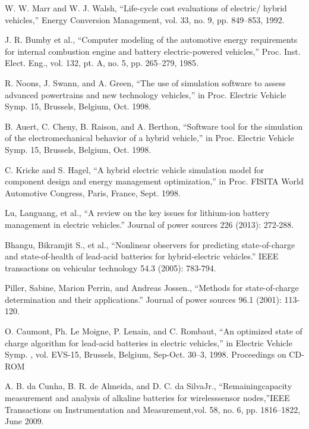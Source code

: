 
W. W. Marr and W. J. Walsh, ``Life-cycle cost evaluations of electric/
hybrid vehicles,” Energy Conversion Management, vol. 33, no. 9,
pp. 849–853, 1992.

J. R. Bumby et al., ``Computer modeling of the automotive energy requirements
for internal combustion engine and battery electric-powered
vehicles,” Proc. Inst. Elect. Eng., vol. 132, pt. A, no. 5, pp. 265–279,
1985.

R. Noons, J. Swann, and A. Green, ``The use of simulation software
to assess advanced powertrains and new technology vehicles,” in Proc.
Electric Vehicle Symp. 15, Brussels, Belgium, Oct. 1998.

B. Auert, C. Cheny, B. Raison, and A. Berthon, ``Software tool for the
simulation of the electromechanical behavior of a hybrid vehicle,” in
Proc. Electric Vehicle Symp. 15, Brussels, Belgium, Oct. 1998.

C. Kricke and S. Hagel, ``A hybrid electric vehicle simulation model
for component design and energy management optimization,” in Proc.
FISITA World Automotive Congress, Paris, France, Sept. 1998.

Lu, Languang, et al., ``A review on the key issues for lithium-ion battery management in electric vehicles.'' Journal of power sources 226 (2013): 272-288.

Bhangu, Bikramjit S., et al., ``Nonlinear observers for predicting state-of-charge and state-of-health of lead-acid batteries for hybrid-electric vehicles.'' IEEE transactions on vehicular technology 54.3 (2005): 783-794.

Piller, Sabine, Marion Perrin, and Andreas Jossen., ``Methods for state-of-charge determination and their applications.'' Journal of power sources 96.1 (2001): 113-120.

O. Caumont, Ph. Le Moigne, P. Lenain, and C. Rombaut, ``An optimized
state of charge algorithm for lead-acid batteries in electric vehicles,” in
Electric Vehicle Symp. , vol. EVS-15, Brussels, Belgium, Sep-Oct. 30–3,
1998. Proceedings on CD-ROM

A. B. da Cunha, B. R. de Almeida, and D. C. da SilvaJr., ``Remainingcapacity  measurement  and  analysis  of  alkaline  batteries  for  wirelesssensor nodes,”IEEE Transactions on Instrumentation and Measurement,vol. 58, no. 6, pp. 1816–1822, June 2009.


